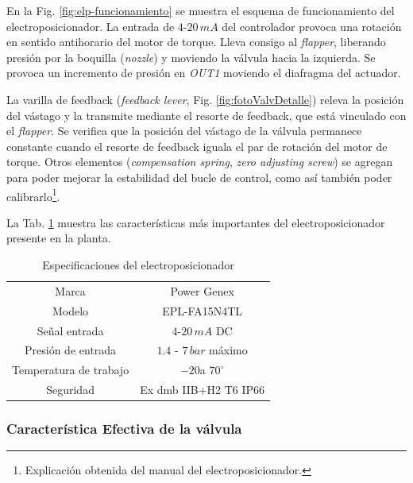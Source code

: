 En la Fig. \ref{fig:elp-funcionamiento} se muestra el esquema de
funcionamiento del electroposicionador.
La entrada de $4$-$20\,mA$ del controlador provoca una rotación en sentido
antihorario del motor de torque.
Lleva consigo al \emph{flapper}, liberando
presión por la boquilla (\emph{nozzle}) y moviendo la válvula hacia la
izquierda.
Se provoca un incremento de presión en \emph{OUT1} moviendo el diafragma del
actuador.

La varilla de feedback (\emph{feedback lever}, Fig. \ref{fig:fotoValvDetalle})
releva la posición del vástago y
la transmite mediante el resorte de feedback, que está vinculado con el
\emph{flapper}.
Se verifica que la posición del vástago de la válvula permanece constante
cuando el resorte de feedback iguala el par de rotación del motor de torque.
Otros elementos (\emph{compensation spring}, \emph{zero adjusting screw}) se
agregan para poder mejorar la estabilidad del bucle de control, como así
también poder calibrarlo\footnote{Explicación obtenida del manual del
electroposicionador.}.

La Tab. \ref{tab:especifElectroP} muestra las características más importantes
del electroposicionador presente en la planta.

\begin{table}[ht]
\renewcommand{\arraystretch}{1.3}
 \centering
 \begin{tabular}{|c|c|}
  \hline
  Marca & Power Genex\\
  Modelo & EPL-FA15N4TL\\
  Señal entrada & $4$-$20\,mA$ DC\\
  Presión de entrada & $1.4$ - $7\,bar$ máximo\\
  Temperatura de trabajo & $-20$a $70^\circ$\\
  Seguridad & Ex dmb IIB+H2 T6 IP66\\
  \hline
 \end{tabular}
 \caption{Especificaciones del electroposicionador}
 \label{tab:especifElectroP}
\end{table}

\subsubsection{Característica Efectiva de la válvula}

